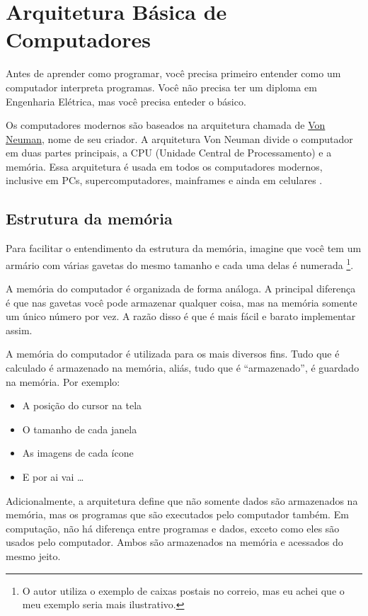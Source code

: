 \chapter{Arquitetura Básica de Computadores}

Antes de aprender como programar, você precisa primeiro entender como um computador interpreta programas. Você não precisa ter um diploma em Engenharia Elétrica, mas você precisa enteder o básico.

Os computadores modernos são baseados na arquitetura chamada de \href{http://en.wikipedia.org/wiki/Von_Neumann_architecture}{Von Neuman}, nome de seu criador. A arquitetura Von Neuman divide o computador em duas partes principais, a CPU (Unidade Central de Processamento) e a memória. Essa arquitetura é usada em todos os computadores modernos, inclusive em PCs, supercomputadores, mainframes e ainda em celulares \cite{Bartlett}.

\section{Estrutura da memória}

Para facilitar o entendimento da estrutura da memória, imagine que você tem um armário com várias gavetas do mesmo tamanho e cada uma delas é numerada \footnote{O autor utiliza o exemplo de caixas postais no correio, mas eu achei que o meu exemplo seria mais ilustrativo.}.

A memória do computador é organizada de forma análoga. A principal diferença é que nas gavetas você pode armazenar qualquer coisa, mas na memória somente um único número por vez. A razão disso é que é mais fácil e barato implementar assim.

A memória do computador é utilizada para os mais diversos fins. Tudo que é calculado é armazenado na memória, aliás, tudo que é ``armazenado'', é guardado na memória. Por exemplo:

\begin{itemize}
\item A posição do cursor na tela
\item O tamanho de cada janela
\item As imagens de cada ícone
\item E por ai vai \ldots
\end{itemize}

Adicionalmente, a arquitetura define que não somente dados são armazenados na memória, mas os programas que são executados pelo computador também. Em computação, não há diferença entre programas e dados, exceto como eles são usados pelo computador. Ambos são armazenados na memória e acessados do mesmo jeito.

